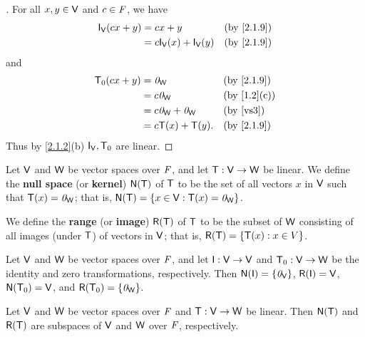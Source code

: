 \begin{proof}[]
  For all \(x, y \in \mathsf{V}\) and \(c \in \mathit{F}\), we have
  \begin{align*}
    \IT[\V](cx + y) & = cx + y                    &  & \by{2.1.9} \\
                    & = c \IT[\V](x) + \IT[\V](y) &  & \by{2.1.9}
  \end{align*}
  and
  \begin{align*}
    \zT(cx + y) & = \zv_{\W}              &  & \by{2.1.9}            \\
                & = c \zv_{\W}            &  & \by{1.2}[c]           \\
                & = c \zv_{\W} + \zv_{\W} &  & \text{(by \ref{vs3})} \\
                & = c\T(x) + \T(y).       &  & \by{2.1.9}
  \end{align*}
  Thus by \cref{2.1.2}(b) \(\IT[\V], \zT\) are linear.
\end{proof}

\begin{defn}\label{2.1.10}
  Let \(\mathsf{V}\) and \(\mathsf{W}\) be vector spaces over \(\mathit{F}\), and let \(\mathsf{T} : \mathsf{V} \to \mathsf{W}\) be linear.
  We define the \textbf{null space} (or \textbf{kernel}) \(\ns{\T}\) of \(\mathsf{T}\) to be the set of all vectors \(x\) in \(\mathsf{V}\) such that \(\mathsf{T}(x) = \mathit{0}_{\mathsf{W}}\);
  that is, \(\ns{\T} = \set{x \in \V : \T(x) = \zv_{\W}}\).

  We define the \textbf{range} (or \textbf{image}) \(\rg{\T}\) of \(\mathsf{T}\) to be the subset of \(\mathsf{W}\) consisting of all images (under \(\mathsf{T}\)) of vectors in \(\mathsf{V}\);
  that is, \(\rg{\T} = \set{\T(x) : x \in V}\).
\end{defn}

\begin{eg}\label{2.1.11}
  Let \(\mathsf{V}\) and \(\mathsf{W}\) be vector spaces over \(\mathit{F}\), and let \(\IT : \V \to \V\) and \(\mathsf{T}_0 : \mathsf{V} \to \mathsf{W}\) be the identity and zero transformations, respectively.
  Then \(\ns{\IT} = \set{\zv_{\V}}\), \(\rg{\IT} = \V\), \(\ns{\zT} = \V\), and \(\rg{\zT} = \set{\zv_{\W}}\).
\end{eg}

\begin{thm}\label{2.1}
  Let \(\mathsf{V}\) and \(\mathsf{W}\) be vector spaces over \(\mathit{F}\) and \(\mathsf{T} : \mathsf{V} \to \mathsf{W}\) be linear.
  Then \(\ns{\T}\) and \(\rg{\T}\) are subspaces of \(\mathsf{V}\) and \(\mathsf{W}\) over \(\mathit{F}\), respectively.
\end{thm}

